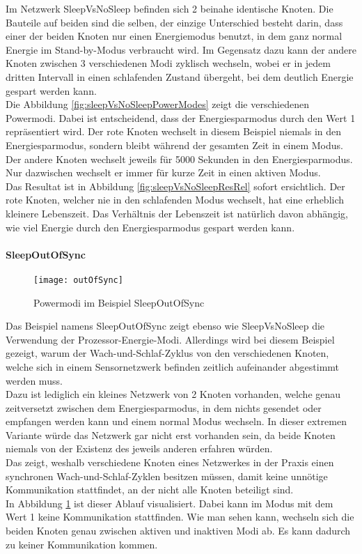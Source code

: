Im Netzwerk SleepVsNoSleep befinden sich 2 beinahe identische Knoten. Die Bauteile auf beiden sind die selben, der einzige Unterschied besteht darin, dass einer der beiden Knoten nur einen Energiemodus benutzt, in dem ganz normal Energie im Stand-by-Modus verbraucht wird. Im Gegensatz dazu kann der andere Knoten zwischen 3 verschiedenen Modi zyklisch wechseln, wobei er in jedem dritten Intervall in einen schlafenden Zustand übergeht, bei dem deutlich Energie gespart werden kann.\\
Die Abbildung \ref{fig:sleepVsNoSleepPowerModes} zeigt die verschiedenen Powermodi. Dabei ist entscheidend, dass der Energiesparmodus durch den Wert 1 repräsentiert wird. Der rote Knoten wechselt in diesem Beispiel niemals in den Energiesparmodus, sondern bleibt während der gesamten Zeit in einem Modus. Der andere Knoten wechselt jeweils für 5000 Sekunden in den Energiesparmodus. Nur dazwischen wechselt er immer für kurze Zeit in einen aktiven Modus.\\
Das Resultat ist in Abbildung \ref{fig:sleepVsNoSleepResRel} sofort ersichtlich. Der rote Knoten, welcher nie in den schlafenden Modus wechselt, hat eine erheblich kleinere Lebenszeit. Das Verhältnis der Lebenszeit ist natürlich davon abhängig, wie viel Energie durch den Energiesparmodus gespart werden kann.

\paragraph{SleepOutOfSync}

\begin{figure}[htbp]
\centering
\caption{Powermodi im Beispiel SleepOutOfSync}
\label{fig:sleepOutOfSyncModes}
\texttt{[image: outOfSync]}
\end{figure}

Das Beispiel namens SleepOutOfSync zeigt ebenso wie SleepVsNoSleep die Verwendung der Prozessor-Energie-Modi. Allerdings wird bei diesem Beispiel gezeigt, warum der Wach-und-Schlaf-Zyklus von den verschiedenen Knoten, welche sich in einem Sensornetzwerk befinden zeitlich aufeinander abgestimmt werden muss.\\
Dazu ist lediglich ein kleines Netzwerk von 2 Knoten vorhanden, welche genau zeitversetzt zwischen dem Energiesparmodus, in dem nichts gesendet oder empfangen werden kann und einem normal Modus wechseln. In dieser extremen Variante würde das Netzwerk gar nicht erst vorhanden sein, da beide Knoten niemals von der Existenz des jeweils anderen erfahren würden.\\
Das zeigt, weshalb verschiedene Knoten eines Netzwerkes in der Praxis einen synchronen Wach-und-Schlaf-Zyklen besitzen müssen, damit keine unnötige Kommunikation stattfindet, an der nicht alle Knoten beteiligt sind.\\
In Abbildung \ref{fig:sleepOutOfSyncModes} ist dieser Ablauf visualisiert. Dabei kann im Modus mit dem Wert 1 keine Kommunikation stattfinden. Wie man sehen kann, wechseln sich die beiden Knoten genau zwischen aktiven und inaktiven Modi ab. Es kann dadurch zu keiner Kommunikation kommen.